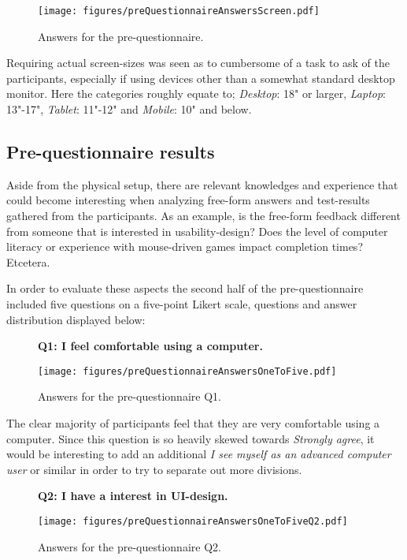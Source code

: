     \begin{figure}[h!]
      \centering
      \texttt{[image: figures/preQuestionnaireAnswersScreen.pdf]}
      \caption{Answers for the pre-questionnaire.}
    \end{figure}

    Requiring actual screen-sizes was seen as to cumbersome of a task to
    ask of the participants, especially if using devices other than a
    somewhat standard desktop monitor. Here the categories roughly equate
    to; \textit{Desktop}: 18" or larger, \textit{Laptop}: 13"-17", \textit{Tablet}:
    11"-12" and \textit{Mobile}: 10" and below.

  \subsection{Pre-questionnaire results}

    Aside from the physical setup, there are relevant knowledges and
    experience that could become interesting when analyzing free-form
    answers and test-results gathered from the participants. As an example,
    is the free-form feedback different from someone that is interested in
    usability-design? Does the level of computer literacy or experience
    with mouse-driven games impact completion times? Etcetera.

    In order to evaluate these aspects the second half of the
    pre-questionnaire included five questions on a five-point Likert scale,
    questions and answer distribution displayed below:

    \begin{figure}[h!]
      \textbf{Q1: I feel comfortable using a computer.}
      \begin{center}
        \texttt{[image: figures/preQuestionnaireAnswersOneToFive.pdf]}
        \vspace{-1cm}
        \caption{Answers for the pre-questionnaire Q1.}
      \end{center}
    \end{figure}

    The clear majority of participants feel that they are very comfortable
    using a computer. Since this question is so heavily skewed towards
    \textit{Strongly agree}, it would be interesting to add an additional
    \textit{I see myself as an advanced computer user} or similar in order
    to try to separate out more divisions.

    \begin{figure}[h!]
      \textbf{Q2: I have a interest in UI-design.}
      \begin{center}
        \texttt{[image: figures/preQuestionnaireAnswersOneToFiveQ2.pdf]}
        \vspace{-1cm}
        \caption{Answers for the pre-questionnaire Q2.}
      \end{center}
    \end{figure}

